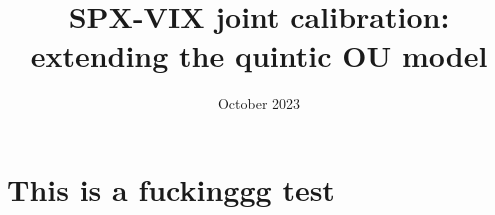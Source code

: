 \documentclass[a4paper, 12pt]{article}
\title{SPX-VIX joint calibration: extending the quintic OU model}
\author{}
\date{October 2023}
\begin{document}
\maketitle

\section{This is a fuckinggg test}
\end{document}
